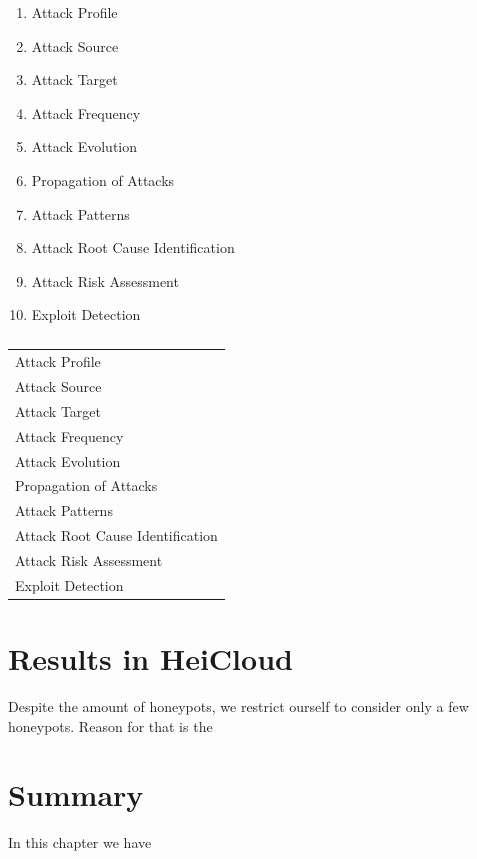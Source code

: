 \begin{enumerate}
    \item Attack Profile
    \item Attack Source
    \item Attack Target
    \item Attack Frequency
    \item Attack Evolution
    \item Propagation of Attacks
    \item Attack Patterns
    \item Attack Root Cause Identification
    \item Attack Risk Assessment
    \item Exploit Detection
\end{enumerate}

\begin{table}[h]
    \centering
    \caption{}
    \begin{tabularx}{\linewidth}{l}
        \toprule
        Attack Profile\\
        Attack Source\\
        Attack Target\\
        Attack Frequency\\
        Attack Evolution\\
        Propagation of Attacks\\
        Attack Patterns\\
        Attack Root Cause Identification\\
        Attack Risk Assessment\\
        Exploit Detection\\
        \bottomrule
    \end{tabularx}
    \label{tab:overview-data-analysis}
\end{table}


\section{Results in HeiCloud}



Despite the amount of honeypots, we restrict ourself to consider only a few honeypots.
Reason for that is the 

\section{Summary}

In this chapter we have 